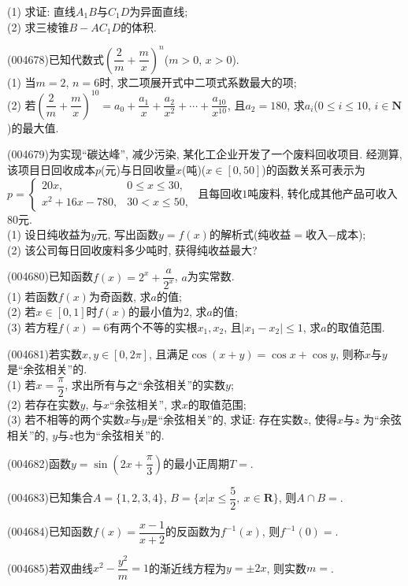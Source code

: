 (1) 求证: 直线$A_1B$与$C_1D$为异面直线;\\
(2) 求三棱锥$B-AC_1D$的体积.
\item (004678)已知代数式$(\dfrac 2m+\dfrac mx)^n$($m>0$, $x>0$).\\
(1) 当$m=2$, $n=6$时, 求二项展开式中二项式系数最大的项;\\
(2) 若$(\dfrac 2m+\dfrac mx)^{10}=a_0+\dfrac{a_1}x+\dfrac{a_2}{x^2}+\cdots +\dfrac{a_{10}}{x^{10}}$, 且$a_2=180$, 求$a_i$($0\le i \le 10$, $i\in \mathbf{N}$)的最大值.
\item (004679)为实现``碳达峰'', 减少污染, 某化工企业开发了一个废料回收项目. 经测算, 该项目日回收成本$p$(元)与日回收量$x$(吨)($x\in [0,50]$)的函数关系可表示为$p=\begin{cases}20x, & 0\le x\le 30,  \\ x^2+16x-780, & 30<x \le 50,  \end{cases}$ 且每回收$1$吨废料, 转化成其他产品可收入$80$元.\\
(1) 设日纯收益为$y$元, 写出函数$y=f(x)$的解析式(纯收益$=$收入$-$成本);\\
(2) 该公司每日回收废料多少吨时, 获得纯收益最大?
\item (004680)已知函数$f(x)=2^x+\dfrac a{2^x}$, $a$为实常数.\\
(1) 若函数$f(x)$为奇函数, 求$a$的值;\\
(2) 若$x\in [0,1]$时$f(x)$的最小值为$2$, 求$a$的值;\\
(3) 若方程$f(x)=6$有两个不等的实根$x_1,x_2$, 且$|x_1-x_2|\le 1$, 求$a$的取值范围.
\item (004681)若实数$x,y\in [0,2\pi]$, 且满足$\cos (x+y)=\cos x+\cos y$, 则称$x$与$y$是``余弦相关''的.\\
(1) 若$x=\dfrac{\pi}2$, 求出所有与之``余弦相关''的实数$y$;\\
(2) 若存在实数$y$, 与$x$``余弦相关'', 求$x$的取值范围;\\
(3) 若不相等的两个实数$x$与$y$是``余弦相关''的, 求证: 存在实数$z$, 使得$x$与$z$ 为``余弦相关''的, $y$与$z$也为``余弦相关''的.
\item (004682)函数$y=\sin (2x+\dfrac{\pi}3)$的最小正周期$T=$.
\item (004683)已知集合$A=\{1,2,3,4\}$, $B=\{x|x\le \dfrac 52, \ x\in \mathbf{R}\}$, 则$A\cap B=$.
\item (004684)已知函数$f(x)=\dfrac{x-1}{x+2}$的反函数为$f^{-1}(x)$, 则$f^{-1}(0)=$.
\item (004685)若双曲线$x^2-\dfrac{y^2}m=1$的渐近线方程为$y=\pm 2x$, 则实数$m=$.
